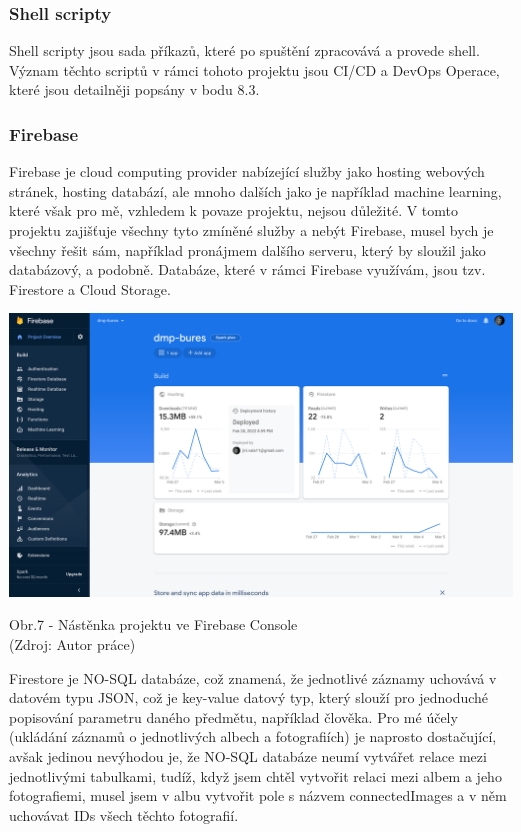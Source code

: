 \documentclass[12pt,a4paper]{report}
\begin{document}
  \subsubsection{Shell scripty}
  Shell scripty jsou sada příkazů, které po spuštění zpracovává a provede shell. Význam těchto
  scriptů v rámci tohoto projektu jsou CI/CD a DevOps Operace, které jsou detailněji popsány v bodu 8.3.
  \subsubsection{Firebase}
  Firebase je cloud computing provider nabízející služby jako hosting webových stránek, hosting
  databází, ale mnoho dalších jako je například machine learning, které však pro mě, vzhledem k
  povaze projektu, nejsou důležité. V tomto projektu zajišťuje všechny tyto zmíněné služby a nebýt
  Firebase, musel bych je všechny řešit sám, například pronájmem dalšího serveru, který by sloužil jako databázový, a podobně.
  Databáze, které v rámci Firebase využívám, jsou tzv. Firestore a Cloud Storage.

  \vspace*{0.5cm}
  \noindent\includegraphics[width=\linewidth]{firebaseDash.png}
  \begin{center}
    Obr.7 -  Nástěnka projektu ve Firebase Console \\
    (Zdroj: Autor práce)
  \end{center}
  \vspace*{0.5cm}
  Firestore je NO-SQL databáze, což znamená, že jednotlivé záznamy uchovává v datovém typu
  JSON, což je key-value datový typ, který slouží pro jednoduché popisování parametru daného
  předmětu, například člověka. Pro mé účely (ukládání záznamů o jednotlivých albech a fotografiích)
  je naprosto dostačující, avšak jedinou nevýhodou je, že NO-SQL databáze neumí vytvářet relace
  mezi jednotlivými tabulkami, tudíž, když jsem chtěl vytvořit relaci mezi albem a jeho fotografiemi,
  musel jsem v albu vytvořit pole s názvem connectedImages a v něm uchovávat IDs všech těchto
  fotografií.
\end{document}
